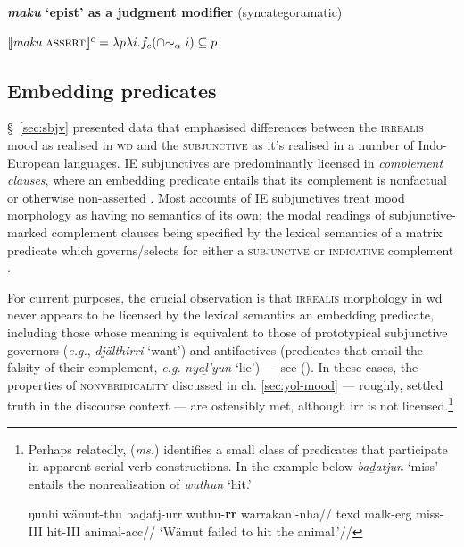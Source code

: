 	\pex \textbf{\textit{maku} `\gls{epist}' as a judgment modifier} (syncategoramatic)
	
	$ \denote[c]{\textit{maku}~\textsc{assert}}=\lambda p\lambda i. f_c(\cap{\sim_\alpha i})\subseteq p$

	
	
	
	\xe
		\label{sec:epist}
	
\subsection{Embedding predicates}\label{sec:sbjv2}

\S~\ref{sec:sbjv} presented data that emphasised differences between the \textsc{irrealis} mood as realised in \textsc{wd} and the \textsc{subjunctive} as it's realised in a number of Indo-European languages. IE subjunctives are predominantly licensed in \textit{complement clauses}, where an embedding predicate entails that its complement is nonfactual or otherwise non-asserted \citep[see discussion in][]{Palmer2001}. Most accounts of IE subjunctives treat mood morphology as having no semantics of its own; the modal readings of subjunctive-marked complement clauses being specified by the lexical semantics of a matrix predicate which governs/selects for either a \textsc{subjunctve} or \textsc{indicative} complement \citep[see also][~ch.~2]{Portner2018a}.

For current purposes, the crucial observation is that \textsc{irrealis} morphology in \gls{wd} never appears to be licensed by the lexical semantics an embedding predicate, including those whose meaning is equivalent to those of prototypical subjunctive governors (\textit{e.g.}, \textit{djälthirri} `want') and antifactives (predicates that entail the falsity of their complement, \textit{e.g.} \textit{nyaḻ'yun} `lie') --- see (). In these cases, the properties of \textsc{nonveridicality} discussed in ch. \ref{sec:yol-mood} --- roughly, settled truth in the discourse context --- are ostensibly met, although \gls{irr} is not licensed.\footnote{Perhaps relatedly, \citet{Wilkinson} (\textit{ms.}) identifies a small class of predicates that participate in apparent serial verb constructions. In the example below \textit{baḏatjun} `miss' entails the nonrealisation of \textit{wuthun} `hit.'
	
	\ex[exno=i]\begingl\gla ŋunhi wämut-thu baḏatj-urr wuthu-\textbf{rr} warrakan'-nha//
	\glb \gls{texd} \gls{malk}-\gls{erg} miss-\gls{III} hit-\gls{III} animal-\gls{acc}//
	\glft`Wämut failed to hit the animal.'//\endgl\xe
}





